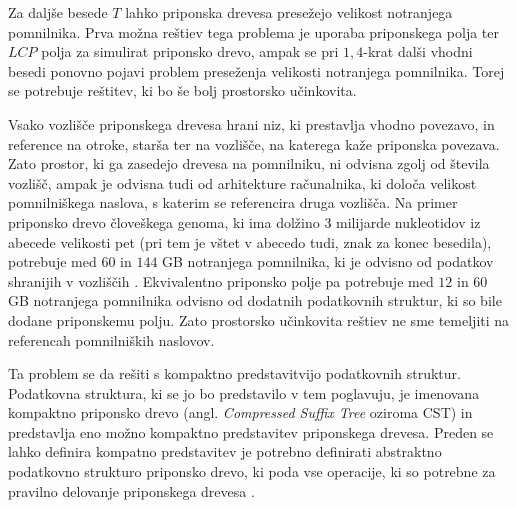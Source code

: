 Za daljše besede $T$ lahko priponska drevesa presežejo velikost notranjega pomnilnika. Prva možna reštiev tega problema je uporaba priponskega polja ter $LCP$ polja za simulirat priponsko drevo, ampak se pri $1,4$-krat dalši vhodni besedi ponovno pojavi problem preseženja velikosti notranjega pomnilnika. Torej se potrebuje reštitev, ki bo še bolj prostorsko učinkovita. 

Vsako vozlišče priponskega drevesa hrani niz, ki prestavlja vhodno povezavo, in reference na otroke, starša ter na vozlišče, na katerega kaže priponska povezava. Zato prostor, ki ga zasedejo drevesa na pomnilniku, ni odvisna zgolj od števila vozlišč, ampak je odvisna tudi od arhitekture računalnika, ki določa velikost pomnilniškega naslova, s katerim se referencira druga vozlišča. Na primer priponsko drevo človeškega genoma, ki ima dolžino 3 milijarde nukleotidov iz abecede velikosti pet (pri tem je vštet v abecedo tudi, znak za konec besedila), potrebuje med $60$ in $144$ GB notranjega pomnilnika, ki je odvisno od podatkov shranijih v vozliščih \cite{GENOMEKNOWLEDGEHUB-2024-10-30}. Ekvivalentno priponsko polje pa potrebuje med $12$ in $60$ GB notranjega pomnilnika odvisno od dodatnih podatkovnih struktur, ki so bile dodane priponskemu polju. Zato prostorsko učinkovita reštiev ne sme temeljiti na referencah pomnilniških naslovov.

Ta problem se da rešiti s kompaktno predstavitvijo podatkovnih struktur. Podatkovna struktura, ki se jo bo predstavilo v tem poglavuju, je imenovana kompaktno priponsko drevo (angl. \textit{Compressed Suffix Tree} oziroma CST) in predstavlja eno možno kompaktno predstavitev priponskega drevesa. Preden se lahko definira kompatno predstavitev je potrebno definirati abstraktno podatkovno strukturo priponsko drevo, ki poda vse operacije, ki so potrebne za pravilno delovanje priponskega drevesa \cite{Sadakane2007}.

